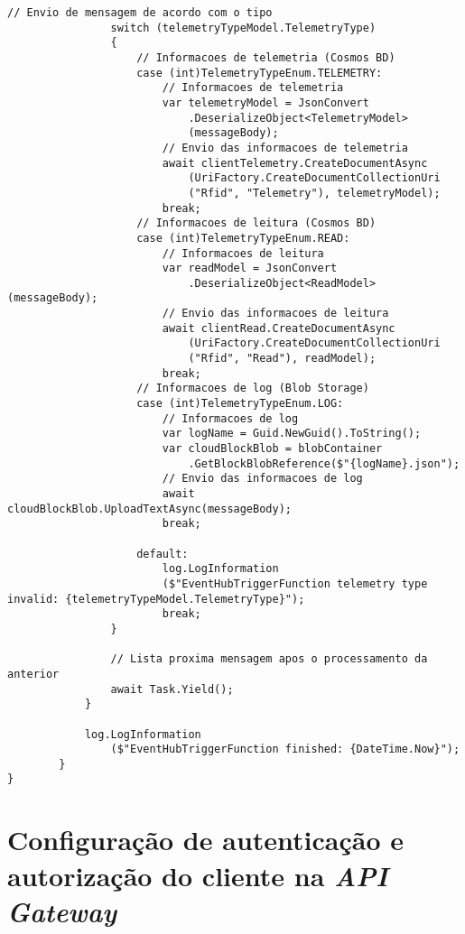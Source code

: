 \begin{lstlisting}[language={[Sharp]C}, label=azure-functions]
                // Envio de mensagem de acordo com o tipo
                switch (telemetryTypeModel.TelemetryType)
                {
                    // Informacoes de telemetria (Cosmos BD)
                    case (int)TelemetryTypeEnum.TELEMETRY:
                        // Informacoes de telemetria
                        var telemetryModel = JsonConvert
                            .DeserializeObject<TelemetryModel>
                            (messageBody);
                        // Envio das informacoes de telemetria
                        await clientTelemetry.CreateDocumentAsync
                            (UriFactory.CreateDocumentCollectionUri
                            ("Rfid", "Telemetry"), telemetryModel);
                        break;
                    // Informacoes de leitura (Cosmos BD)
                    case (int)TelemetryTypeEnum.READ:
                        // Informacoes de leitura
                        var readModel = JsonConvert
                            .DeserializeObject<ReadModel>(messageBody);
                        // Envio das informacoes de leitura
                        await clientRead.CreateDocumentAsync
                            (UriFactory.CreateDocumentCollectionUri
                            ("Rfid", "Read"), readModel);
                        break;
                    // Informacoes de log (Blob Storage)
                    case (int)TelemetryTypeEnum.LOG:
                        // Informacoes de log
                        var logName = Guid.NewGuid().ToString();
                        var cloudBlockBlob = blobContainer
                            .GetBlockBlobReference($"{logName}.json");
                        // Envio das informacoes de log
                        await cloudBlockBlob.UploadTextAsync(messageBody);
                        break;
                        
                    default:
                        log.LogInformation
                        ($"EventHubTriggerFunction telemetry type invalid: {telemetryTypeModel.TelemetryType}");
                        break;
                }

                // Lista proxima mensagem apos o processamento da anterior
                await Task.Yield();
            }

            log.LogInformation
                ($"EventHubTriggerFunction finished: {DateTime.Now}");
        }
}
\end{lstlisting}

\section{Configuração de autenticação e autorização do cliente na \textit{API Gateway}}

